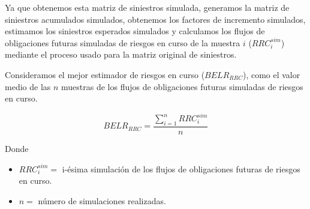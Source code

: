 \documentclass[11pt,twoside,openright,spanish]{report}
\numberwithin{equation}{chapter}
\numberwithin{figure}{chapter}
\numberwithin{table}{chapter}
\begin{document}
Ya que obtenemos esta matriz de siniestros simulada, generamos la matriz de siniestros acumulados simulados, obtenemos los factores de incremento simulados, estimamos los siniestros esperados simulados y calculamos los flujos de obligaciones futuras simuladas de riesgos en curso de la muestra $i$ ($RRC_{i}^{sim}$) mediante el proceso usado para la matriz original de siniestros.
	
	 
	
	Consideramos el mejor estimador de riesgos en curso ($BELR_{RRC}$), como el valor medio de las $n$ muestras de los flujos de obligaciones futuras simuladas de riesgos en curso.


	 

	
	\begin{equation}
		BELR_{RRC}^{}=\frac{\sum _{i=1}^{n}RRC_{i}^{sim}}{n}
		\label{eq9}
		\end{equation}
			


 
	
	Donde
	
	 
		\begin{itemize}
		\setlength\itemsep{-0.5em}
	\item $RRC_{i}^{sim}=$ i-ésima simulación de los flujos de obligaciones futuras de riesgos en curso.
	
	\item $n=$ número de simulaciones realizadas.
	\end{itemize}
	
\begin{comment}	
	 
	Para Salud Individual Dental, el $BELR_{RRC}$ se calculará como el producto de la prima de tarifa no devengada y el factor de siniestralidad última de mercado proporcionado por la Comisión Nacional de Seguros y Fianzas:


	 

$ $

 
	
	
	{\centering
		$BELR_{RRC}^{}=PTND_{} \cdot FS_{BEL}^{RRC}$
		\noindent
		
	}
	
	 

$ $

 
	
	Donde
	
	 
	
	$PTND_{}=$ Prima de tarifa no devengada.
\begin{comment}	
	$FS_{BEL}^{RRC}=$ Factor de Siniestralidad última con información de mercado.
	
	 

$ $

 

	El cálculo del $BELR_{RRC}$, se realizará de forma trimestral y se prorrateara con el vigor de la valuación del cierre de mes a fin de obtener la reserva de riesgos en curso.

\end{comment}
	
\end{document}
